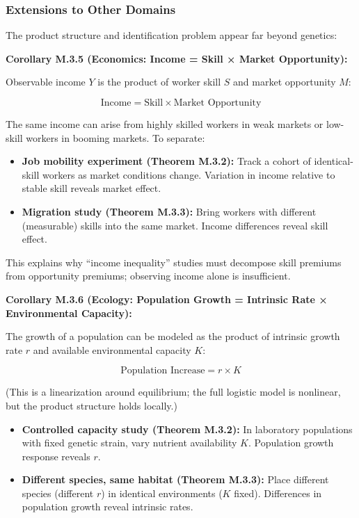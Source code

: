 \documentclass[
]{article}
\providecommand{\tightlist}{%
  \setlength{\itemsep}{0pt}\setlength{\parskip}{0pt}}
\begin{document}
\subsubsection{Extensions to Other
Domains}\label{extensions-to-other-domains}

The product structure and identification problem appear far beyond
genetics:

\textbf{Corollary M.3.5 (Economics: Income = Skill × Market
Opportunity):}

Observable income \(Y\) is the product of worker skill \(S\) and market
opportunity \(M\):

\[\text{Income} = \text{Skill} \times \text{Market Opportunity}\]

The same income can arise from highly skilled workers in weak markets or
low-skill workers in booming markets. To separate:

\begin{itemize}
\tightlist
\item
  \textbf{Job mobility experiment (Theorem M.3.2):} Track a cohort of
  identical-skill workers as market conditions change. Variation in
  income relative to stable skill reveals market effect.
\item
  \textbf{Migration study (Theorem M.3.3):} Bring workers with different
  (measurable) skills into the same market. Income differences reveal
  skill effect.
\end{itemize}

This explains why ``income inequality'' studies must decompose skill
premiums from opportunity premiums; observing income alone is
insufficient.

\textbf{Corollary M.3.6 (Ecology: Population Growth = Intrinsic Rate ×
Environmental Capacity):}

The growth of a population can be modeled as the product of intrinsic
growth rate \(r\) and available environmental capacity \(K\):

\[\text{Population Increase} = r \times K\]

(This is a linearization around equilibrium; the full logistic model is
nonlinear, but the product structure holds locally.)

\begin{itemize}
\tightlist
\item
  \textbf{Controlled capacity study (Theorem M.3.2):} In laboratory
  populations with fixed genetic strain, vary nutrient availability
  \(K\). Population growth response reveals \(r\).
\item
  \textbf{Different species, same habitat (Theorem M.3.3):} Place
  different species (different \(r\)) in identical environments (\(K\)
  fixed). Differences in population growth reveal intrinsic rates.
\end{itemize}
\end{document}

